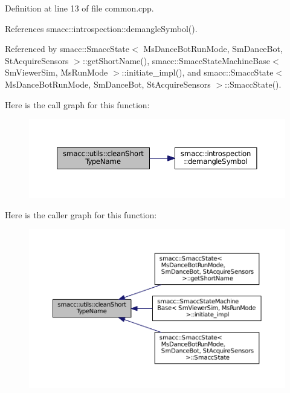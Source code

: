 Definition at line 13 of file common.\+cpp.



References smacc\+::introspection\+::demangle\+Symbol().



Referenced by smacc\+::\+Smacc\+State$<$ Ms\+Dance\+Bot\+Run\+Mode, Sm\+Dance\+Bot, St\+Acquire\+Sensors $>$\+::get\+Short\+Name(), smacc\+::\+Smacc\+State\+Machine\+Base$<$ Sm\+Viewer\+Sim, Ms\+Run\+Mode $>$\+::initiate\+\_\+impl(), and smacc\+::\+Smacc\+State$<$ Ms\+Dance\+Bot\+Run\+Mode, Sm\+Dance\+Bot, St\+Acquire\+Sensors $>$\+::\+Smacc\+State().




Here is the call graph for this function\+:
\nopagebreak
\begin{figure}[H]
\begin{center}
\leavevmode
\includegraphics[width=350pt]{namespacesmacc_1_1utils_aacd1975bb7cd9bec4b50e111a2ae7edb_cgraph}
\end{center}
\end{figure}




Here is the caller graph for this function\+:
\nopagebreak
\begin{figure}[H]
\begin{center}
\leavevmode
\includegraphics[width=350pt]{namespacesmacc_1_1utils_aacd1975bb7cd9bec4b50e111a2ae7edb_icgraph}
\end{center}
\end{figure}


